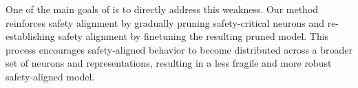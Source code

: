 One of the main goals of \method is to directly address this weakness. Our method reinforces safety alignment by gradually pruning safety-critical neurons and re-establishing safety alignment by finetuning the resulting pruned model. This process encourages safety-aligned behavior to become distributed across a broader set of neurons and representations, resulting in a less fragile and more robust safety-aligned model.
